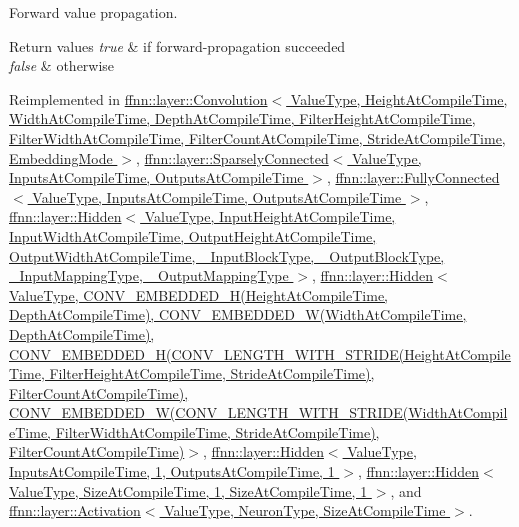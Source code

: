 Forward value propagation. 


\begin{DoxyRetVals}{Return values}
{\em true} & if forward-\/propagation succeeded \\
\hline
{\em false} & otherwise \\
\hline
\end{DoxyRetVals}


Reimplemented in \hyperlink{classffnn_1_1layer_1_1_convolution_a5abc1ff3fb9aadcb18446fa7cdcfee5f}{ffnn\-::layer\-::\-Convolution$<$ Value\-Type, Height\-At\-Compile\-Time, Width\-At\-Compile\-Time, Depth\-At\-Compile\-Time, Filter\-Height\-At\-Compile\-Time, Filter\-Width\-At\-Compile\-Time, Filter\-Count\-At\-Compile\-Time, Stride\-At\-Compile\-Time, Embedding\-Mode $>$}, \hyperlink{classffnn_1_1layer_1_1_sparsely_connected_a53f1d9a2edfdd2e47164b24121c23acc}{ffnn\-::layer\-::\-Sparsely\-Connected$<$ Value\-Type, Inputs\-At\-Compile\-Time, Outputs\-At\-Compile\-Time $>$}, \hyperlink{classffnn_1_1layer_1_1_fully_connected_ac49087ab2d66019f2d0244c76987fa50}{ffnn\-::layer\-::\-Fully\-Connected$<$ Value\-Type, Inputs\-At\-Compile\-Time, Outputs\-At\-Compile\-Time $>$}, \hyperlink{classffnn_1_1layer_1_1_hidden_a41fdfb60b5340c0af46c7c731237e280}{ffnn\-::layer\-::\-Hidden$<$ Value\-Type, Input\-Height\-At\-Compile\-Time, Input\-Width\-At\-Compile\-Time, Output\-Height\-At\-Compile\-Time, Output\-Width\-At\-Compile\-Time, \-\_\-\-Input\-Block\-Type, \-\_\-\-Output\-Block\-Type, \-\_\-\-Input\-Mapping\-Type, \-\_\-\-Output\-Mapping\-Type $>$}, \hyperlink{classffnn_1_1layer_1_1_hidden_a41fdfb60b5340c0af46c7c731237e280}{ffnn\-::layer\-::\-Hidden$<$ Value\-Type, C\-O\-N\-V\-\_\-\-E\-M\-B\-E\-D\-D\-E\-D\-\_\-\-H(\-Height\-At\-Compile\-Time, Depth\-At\-Compile\-Time), C\-O\-N\-V\-\_\-\-E\-M\-B\-E\-D\-D\-E\-D\-\_\-\-W(\-Width\-At\-Compile\-Time, Depth\-At\-Compile\-Time), C\-O\-N\-V\-\_\-\-E\-M\-B\-E\-D\-D\-E\-D\-\_\-\-H(\-C\-O\-N\-V\-\_\-\-L\-E\-N\-G\-T\-H\-\_\-\-W\-I\-T\-H\-\_\-\-S\-T\-R\-I\-D\-E(\-Height\-At\-Compile\-Time, Filter\-Height\-At\-Compile\-Time, Stride\-At\-Compile\-Time), Filter\-Count\-At\-Compile\-Time), C\-O\-N\-V\-\_\-\-E\-M\-B\-E\-D\-D\-E\-D\-\_\-\-W(\-C\-O\-N\-V\-\_\-\-L\-E\-N\-G\-T\-H\-\_\-\-W\-I\-T\-H\-\_\-\-S\-T\-R\-I\-D\-E(\-Width\-At\-Compile\-Time, Filter\-Width\-At\-Compile\-Time, Stride\-At\-Compile\-Time), Filter\-Count\-At\-Compile\-Time)$>$}, \hyperlink{classffnn_1_1layer_1_1_hidden_a41fdfb60b5340c0af46c7c731237e280}{ffnn\-::layer\-::\-Hidden$<$ Value\-Type, Inputs\-At\-Compile\-Time, 1, Outputs\-At\-Compile\-Time, 1 $>$}, \hyperlink{classffnn_1_1layer_1_1_hidden_a41fdfb60b5340c0af46c7c731237e280}{ffnn\-::layer\-::\-Hidden$<$ Value\-Type, Size\-At\-Compile\-Time, 1, Size\-At\-Compile\-Time, 1 $>$}, and \hyperlink{classffnn_1_1layer_1_1_activation_aa7f88c8bc20589dc51d9dd615b8c4580}{ffnn\-::layer\-::\-Activation$<$ Value\-Type, Neuron\-Type, Size\-At\-Compile\-Time $>$}.

